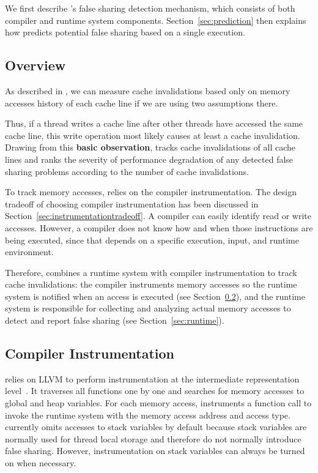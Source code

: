 \label{sec:detection}

We first describe \Predator{}'s false sharing detection mechanism, which consists of both compiler and runtime system components. Section~\ref{sec:prediction} then explains how \Predator{} predicts potential false sharing based on a single execution.

\subsection{Overview}
\label{sec:overview}
As described in \label{sec:detectionidea}, we can measure cache invalidations based only on memory accesses history of each cache line if we are using two assumptions there. 

Thus, if a thread writes a cache line after other threads have accessed the same cache line, this write operation most likely causes at least a cache invalidation. Drawing from this \textbf{basic observation}, \Predator{} tracks cache invalidations of all cache lines and ranks the severity of performance degradation of any detected false sharing problems according to the number of cache invalidations. 
 
To track memory accesses, \Predator{} relies on the compiler instrumentation. The design tradeoff of choosing compiler instrumentation has been discussed in Section~\ref{sec:instrumentationtradeoff}. A compiler can easily identify read or write accesses. However, a compiler does not know how and when those instructions are being executed, since that depends on a specific execution, input, and runtime environment.

Therefore, \Predator{} combines a runtime system with compiler instrumentation to track cache invalidations: the compiler instruments memory accesses so the runtime system is notified when an access is executed (see Section~\ref{sec:compiler}), and the runtime system is responsible for collecting and analyzing actual memory accesses to detect and report false sharing (see Section~\ref{sec:runtime}).

\subsection{Compiler Instrumentation}
\label{sec:compiler}

\Predator{} relies on LLVM to perform instrumentation at the intermediate representation level~\cite{llvm}.
It traverses all functions one by one and searches for memory accesses to global and heap variables.  For each memory access, \Predator{} instruments a function call to invoke the runtime system with the memory access address and access type. \Predator{} currently omits accesses to stack variables by default because stack variables are normally used for thread local storage and therefore do not normally introduce false sharing. However, instrumentation on stack variables
can always be turned on when necessary.

